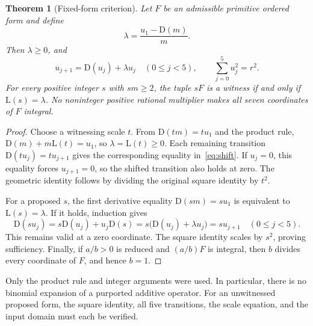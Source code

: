 \documentclass[11pt,a4paper]{article}
\newcommand{\D}{\mathrm{D}}
\newcommand{\Lrate}{\mathrm{L}}
\newtheorem{theorem}{Theorem}[section]
\theoremstyle{definition}
\theoremstyle{remark}
\begin{document}
\begin{theorem}[Fixed-form criterion]\label{thm:criterion}
Let $F$ be an admissible primitive ordered form and define
\begin{equation}\label{eq:lambda}
 \lambda=\frac{u_1-\D(m)}{m}.
\end{equation}
Then $\lambda\ge0$, and
\begin{equation}\label{eq:shift}
 u_{j+1}=\D(u_j)+\lambda u_j\quad(0\le j<5),
 \qquad \sum_{j=0}^{5}u_j^2=r^2.
\end{equation}
For every positive integer $s$ with $sm\ge2$, the tuple $sF$ is a witness
if and only if $\Lrate(s)=\lambda$. No noninteger positive rational
multiplier makes all seven coordinates of $F$ integral.
\end{theorem}
\begin{proof}
Choose a witnessing scale $t$. From $\D(tm)=tu_1$ and the product rule,
$\D(m)+m\Lrate(t)=u_1$, so $\lambda=\Lrate(t)\ge0$. Each remaining
transition $\D(tu_j)=tu_{j+1}$ gives the corresponding equality
in~\eqref{eq:shift}. If $u_j=0$, this equality forces $u_{j+1}=0$,
so the shifted transition also holds at zero. The geometric identity
follows by dividing the original square identity by $t^2$.

For a proposed $s$, the first derivative equality $\D(sm)=su_1$ is
equivalent to $\Lrate(s)=\lambda$. If it holds, induction gives
\[
 \D(su_j)=s\D(u_j)+u_j\D(s)
          =s\bigl(\D(u_j)+\lambda u_j\bigr)=su_{j+1}
 \quad(0\le j<5).
\]
This remains valid at a zero coordinate. The square identity scales by
$s^2$, proving sufficiency. Finally, if $a/b>0$ is reduced and $(a/b)F$
is integral, then $b$ divides every coordinate of $F$, and hence $b=1$.
\end{proof}

Only the product rule and integer arguments were used. In particular,
there is no binomial expansion of a purported additive operator. For an
unwitnessed proposed form, the square identity, all five transitions,
the scale equation, and the input domain must each be verified.
\end{document}
